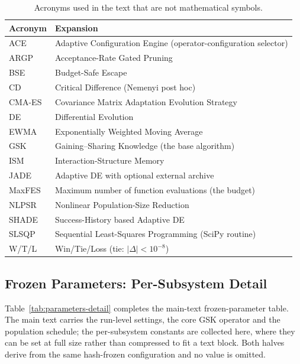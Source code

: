 \documentclass[algorithms,article,submit,moreauthors,pdftex]{Definitions/mdpi}
\begin{document}
\begin{table}[H]
\caption{Acronyms used in the text that are not mathematical symbols.}
\label{tab:acronyms}
\centering
\small
\begin{tabular}{ll}
\toprule
\textbf{Acronym} & \textbf{Expansion}\\
\midrule
ACE & Adaptive Configuration Engine (operator-configuration selector)\\
ARGP & Acceptance-Rate Gated Pruning\\
BSE & Budget-Safe Escape\\
CD & Critical Difference (Nemenyi post hoc)\\
CMA-ES & Covariance Matrix Adaptation Evolution Strategy\\
DE & Differential Evolution\\
EWMA & Exponentially Weighted Moving Average\\
GSK & Gaining--Sharing Knowledge (the base algorithm)\\
ISM & Interaction-Structure Memory\\
JADE & Adaptive DE with optional external archive\\
MaxFES & Maximum number of function evaluations (the budget)\\
NLPSR & Nonlinear Population-Size Reduction\\
SHADE & Success-History based Adaptive DE\\
SLSQP & Sequential Least-Squares Programming (SciPy routine)\\
W/T/L & Win/Tie/Loss (tie: $|\Delta| < 10^{-8}$)\\
\bottomrule
\end{tabular}
\end{table}

\subsection{Frozen Parameters: Per-Subsystem Detail}\label{sec:repro:params-detail}

Table~\ref{tab:parameters-detail} completes the main-text
frozen-parameter table. The main text carries the run-level settings, the
core GSK operator and the population schedule; the per-subsystem constants are
collected here, where they can be set at full size rather than compressed to fit
a text block. Both halves derive from the same hash-frozen configuration and no
value is omitted.

\end{document}
